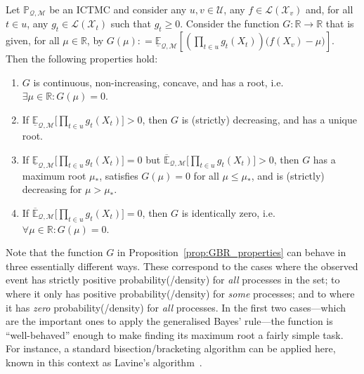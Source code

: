 \documentclass[twoside,11pt]{article}
\newcommand{\reals}{\mathbb{R}}
\newcommand{\states}{\mathcal{X}}
\newcommand{\lexp}{\underline{\mathbb{E}}_{\rateset,\mathcal{M}}}
\newcommand{\uexp}{\overline{\mathbb{E}}_{\rateset,\mathcal{M}}}
\newcommand{\gambles}{\mathcal{L}}
\newcommand{\rateset}{\mathcal{Q}}
\newcommand{\coloneqq}{:\!=}
\begin{document}
\begin{proposition}\label{prop:GBR_properties}
Let $\mathbb{P}_{\rateset,\mathcal{M}}$ be an ICTMC and consider any $u,v\in\mathcal{U}$, any $f\in\gambles(\states_v)$ and, for all $t\in u$, any $g_{t}\in\gambles(\states_{t})$ such that $g_{t}\geq 0$. 
Consider the function $G: \reals\to\reals$ that is given, for all $\mu\in\reals$, by $G(\mu)\coloneqq \lexp\left[\left(\prod_{t\in u} g_{t}(X_{t})\right)\bigl(f(X_v) - \mu\bigr)\right]$.
Then the following properties hold: \vspace{-2pt}
\begin{enumerate}[label=G\arabic*:,ref=G\arabic*]
\item $G$ is continuous, non-increasing, concave, and has a root, i.e. $\exists \mu\in\reals:G(\mu)=0$. \label{GBR:always} \vspace{-3pt}
\item If\/ $\lexp\bigl[\prod_{t\in u} g_{t}(X_{t})\bigr] >0$, then $G$ is (strictly) decreasing, and has a unique root. \label{GBR:low_pos} \vspace{-3pt}
\item If\/ $\lexp\bigl[\prod_{t\in u} g_{t}(X_{t})\bigr]=0$ but $\uexp\bigl[\prod_{t\in u} g_{t}(X_{t})\bigr] >0$, then $G$ has a maximum root $\mu_*$, satisfies $G(\mu)=0$ for all $\mu\leq \mu_*$, and is (strictly) decreasing for $\mu>\mu_*$. \label{GBR:up_pos} \vspace{-3pt}
\item If\/ $\uexp\bigl[\prod_{t\in u} g_{t}(X_{t})\bigr]=0$, then $G$ is identically zero, i.e. $\forall \mu\in\reals: G(\mu)=0$. \label{GBR:none_pos}
\end{enumerate}
\end{proposition}

Note that the function $G$ in Proposition~\ref{prop:GBR_properties} can behave in three essentially different ways. These correspond to the cases where the observed event has strictly positive probability(/density) for \emph{all} processes in the set; to where it only has positive probability(/density) for \emph{some} processes; and to where it has \emph{zero} probability(/density) for \emph{all} processes.
In the first two cases---which are the important ones to apply the generalised Bayes' rule---the function is ``well-behaved'' enough to make finding its maximum root a fairly simple task. For instance, a standard bisection/bracketing algorithm can be applied here, known in this context as Lavine's algorithm~\citep{cozman1997alternatives}.
\end{document}
